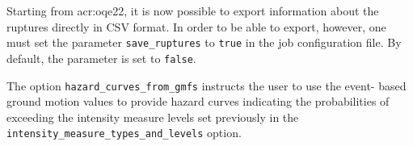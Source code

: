 Starting from \glsdesc{acr:oqe22}, it is now possible to export information
about the ruptures directly in CSV format. In order to be able to export,
however, one must set the parameter \Verb+save_ruptures+ to \Verb+true+ in the
job configuration file. By default, the parameter is set to \Verb+false+.

The option \verb=hazard_curves_from_gmfs= instructs the user to use the event-
based ground motion values to provide hazard curves indicating the
probabilities of exceeding the intensity measure levels set previously in the
\verb=intensity_measure_types_and_levels= option.
